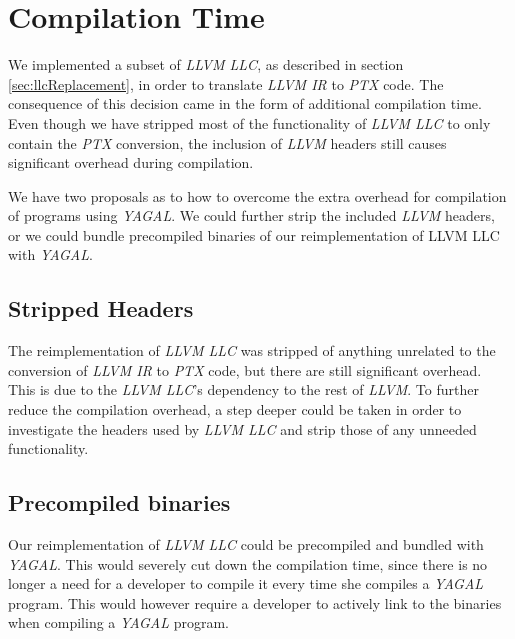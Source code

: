 \section{Compilation Time}

We implemented a subset of \textit{LLVM LLC}, as described in section \ref{sec:llcReplacement}, in order to translate \textit{LLVM IR} to \textit{PTX} code. The consequence of this decision came in the form of additional compilation time. Even though we have stripped most of the functionality of \textit{LLVM LLC} to only contain the \textit{PTX} conversion, the inclusion of \textit{LLVM} headers still causes significant overhead during compilation.

We have two proposals as to how to overcome the extra overhead for compilation of programs using \textit{YAGAL}. We could further strip the included \textit{LLVM} headers, or we could bundle precompiled binaries of our reimplementation of {LLVM LLC} with \textit{YAGAL}.

\subsection{Stripped Headers}
The reimplementation of \textit{LLVM LLC} was stripped of anything unrelated to the conversion of \textit{LLVM IR} to \textit{PTX} code, but there are still significant overhead. This is due to the \textit{LLVM LLC}'s dependency to the rest of \textit{LLVM}. To further reduce the compilation overhead, a step deeper could be taken in order to investigate the headers used by \textit{LLVM LLC} and strip those of any unneeded functionality.


\subsection{Precompiled binaries}
Our reimplementation of \textit{LLVM LLC} could be precompiled and bundled with \textit{YAGAL}. This would severely cut down the compilation time, since there is no longer a need for a developer to compile it every time she compiles a \textit{YAGAL} program. This would however require a developer to actively link to the binaries when compiling a \textit{YAGAL} program. 